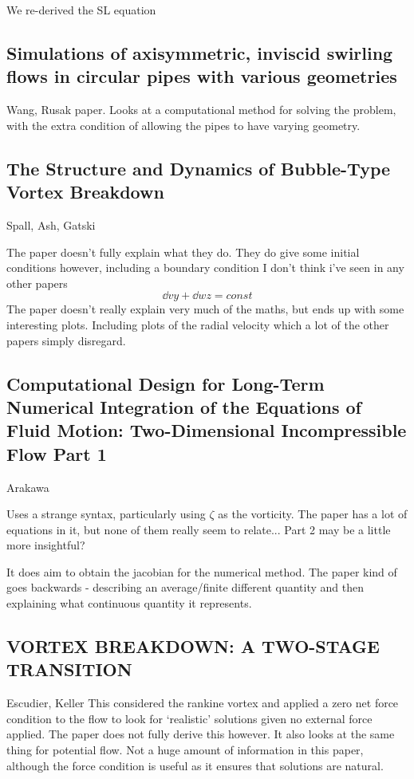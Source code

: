 \documentclass{X:/Documents/Coding/Latex/myreport}
\begin{document}
We re-derived the SL equation

\subsection{Simulations of axisymmetric, inviscid swirling flows in circular pipes with various geometries}
Wang, Rusak paper.
Looks at a computational method for solving the problem, with the extra condition of allowing the pipes to have varying geometry.



\subsection{The Structure and Dynamics of Bubble-Type Vortex Breakdown}
Spall, Ash, Gatski

The paper doesn't fully explain what they do. They do give some initial conditions however, including a boundary condition I don't think i've seen in any other papers
\[\dd vy + \dd wz = const\]
The paper doesn't really explain very much of the maths, but ends up with some interesting plots.
Including plots of the radial velocity which a lot of the other papers simply disregard.
\subsection{Computational Design for Long-Term Numerical Integration of the Equations of Fluid Motion: Two-Dimensional Incompressible Flow Part 1}
Arakawa

Uses a strange syntax, particularly using $\zeta$ as the vorticity.
The paper has a lot of equations in it, but none of them really seem to relate... Part 2 may be a little more insightful?

It does aim to obtain the jacobian for the numerical method. The paper kind of goes backwards - describing an average/finite different quantity and then explaining what continuous quantity it represents.
\subsection{VORTEX BREAKDOWN: A TWO-STAGE TRANSITION}
Escudier, Keller
This considered the rankine vortex and applied a zero net force condition to the flow to look for `realistic' solutions given no external force applied. The paper does not fully derive this however. 
It also looks at the same thing for potential flow. Not a huge amount of information in this paper, although the force condition is useful as it ensures that solutions are natural.
\end{document}
